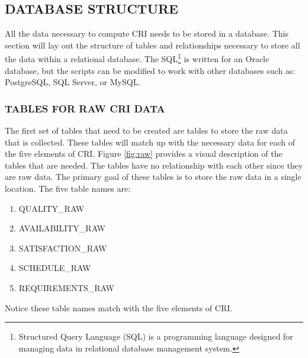 \documentclass[SDSUThesis.tex]{subfiles}
\begin{document}
    \subsection{DATABASE STRUCTURE}
        All the data necessary to compute CRI needs to be stored in a database.  This section will 
        lay out the structure of tables and relationships necessary to store all the data
        within a relational database.  The SQL\footnote{Structured Query Language (SQL) is 
        a programming language designed for managing data in relational database 
        management system.} 
        is written for an Oracle
        database, but the scripts can be modified to work with other databases
        such as: PostgreSQL, SQL Server, or MySQL.  
        
        \subsubsection{TABLES FOR RAW CRI DATA}
        
            The first set of tables that need to be created are tables
            to store the raw data that is collected.  These tables
            will match up with the necessary data for each of the five elements
            of CRI.  Figure \ref{fig:raw} provides a visual description
            of the tables that are needed.  The tables have no relationship
            with each other since they are raw data.  The primary goal of
            these tables is to store the raw data in a single location. The
            five table names are:
            \begin{enumerate}
                \item QUALITY\_RAW
                \item AVAILABILITY\_RAW
                \item SATISFACTION\_RAW
                \item SCHEDULE\_RAW
                \item REQUIREMENTS\_RAW
            \end{enumerate}
            Notice these table names match with the five elements of CRI.
        
\end{document}
